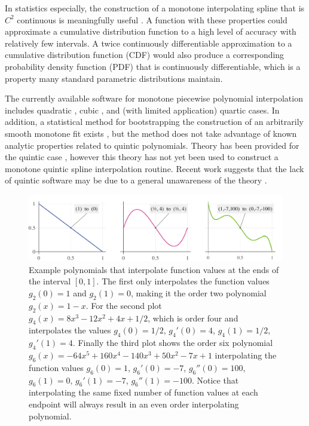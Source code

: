 \documentclass{scspaperproc}
\theoremstyle{scsthe}
\begin{document}
In statistics especially, the construction of a monotone interpolating spline that is $C^2$ continuous is meaningfully useful \cite{ramsay1988monotone}. A function with these properties could approximate a cumulative distribution function to a high level of accuracy with relatively few intervals. A twice continuously differentiable approximation to a cumulative distribution function (CDF) would also produce a corresponding probability density function (PDF) that is continuously differentiable, which is a property many standard parametric distributions maintain.

The currently available software for monotone piecewise polynomial interpolation includes quadratic \cite{he1998monotone}, cubic \cite{fritsch1980monotone}, and (with limited application) quartic \cite{wang2004rational,piah2011improved,yao2018unconditionally} cases. In addition, a statistical method for bootstrapping the construction of an arbitrarily smooth monotone fit exists \cite{leitenstorfer2006generalized}, but the method does not take advantage of known analytic properties related to quintic polynomials. Theory has been provided for the quintic case \cite{ulrich1994positivity,hess1994positive}, however this theory has not yet been used to construct a monotone quintic spline interpolation routine. Recent work suggests that the lack of quintic software may be due to a general unawareness of the theory .

\begin{figure}
  \centering
  \includegraphics[width=.9\textwidth]{spline_demonstration}
  \caption{Example polynomials that interpolate function values at the ends of the interval $[0,1]$. The first only interpolates the function values $g_2(0) = 1$ and $g_2(1) = 0$, making it the order two polynomial $g_2(x) = 1 - x$. For the second plot $g_4(x) = 8x^3 - 12x^2 + 4x + 1/2$, which is order four and interpolates the values $g_4(0) = 1/2$, $g_4'(0) = 4$, $g_4(1) = 1/2$, $g_4'(1) = 4$. Finally the third plot shows the order six polynomial $g_6(x) = - 64x^5 + 160x^4 - 140x^3 + 50x^2 - 7x + 1$ interpolating the function values $g_6(0) = 1$, $g_6'(0) = -7$, $g_6''(0) = 100$, $g_6(1) = 0$, $g_6'(1) = -7$, $g_6''(1) = -100$. Notice that interpolating the same fixed number of function values at each endpoint will always result in an even order interpolating polynomial.
  }\label{fig:spline_demonstration}
\end{figure}
\end{document}
